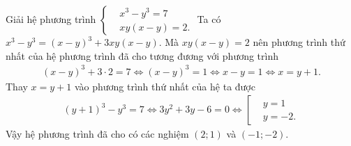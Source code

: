 \begin{ex}%
 Giải hệ phương trình $\left\{\begin{aligned}&x^3-y^3=7 \\&xy(x-y)=2.\end{aligned} \right.$
 \loigiai
  {
  Ta có $x^3-y^3=(x-y)^3+3xy(x-y)$. Mà $xy(x-y)=2$ nên phương trình thứ nhất của hệ phương trình đã cho tương đương với phương trình
  \begin{eqnarray*}
   (x-y)^3+3\cdot 2 = 7 \Leftrightarrow (x-y)^3=1 \Leftrightarrow x-y=1 \Leftrightarrow x=y+1.
  \end{eqnarray*}
  Thay $x=y+1$ vào phương trình thứ nhất của hệ ta được
  \begin{eqnarray*}
   (y+1)^3-y^3=7 \Leftrightarrow 3y^2+3y-6=0 \Leftrightarrow \left[\begin{aligned}&y=1 \\&y=-2. \end{aligned} \right.
  \end{eqnarray*}
  Vậy hệ phương trình đã cho có các nghiệm $(2;1)$ và $(-1;-2)$.
  }
\end{ex}

